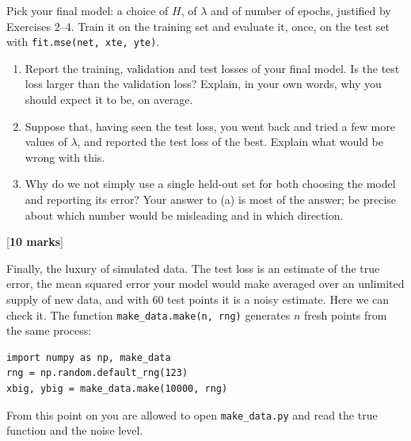 \documentclass[11pt,a4paper]{article}
\newcounter{exercise}
\newenvironment{exercise}[1]{\refstepcounter{exercise}\begin{tcolorbox}[colback=blue!4,colframe=blue!50!black,title=Exercise \theexercise: #1,fonttitle=\bfseries]}{\end{tcolorbox}}
\newcommand{\mk}[1]{\hfill[\textbf{#1 marks}]}
\begin{document}
\begin{exercise}{the test set}
Pick your final model: a choice of $H$, of $\lambda$ and of number of epochs, justified by Exercises 2--4. Train it on the training set and evaluate it, once, on the test set with \texttt{fit.mse(net, xte, yte)}.
\begin{enumerate}[label=(\alph*)]
\item Report the training, validation and test losses of your final model. Is the test loss larger than the validation loss? Explain, in your own words, why you should expect it to be, on average.
\item Suppose that, having seen the test loss, you went back and tried a few more values of $\lambda$, and reported the test loss of the best. Explain what would be wrong with this.
\item Why do we not simply use a single held-out set for both choosing the model and reporting its error? Your answer to (a) is most of the answer; be precise about which number would be misleading and in which direction.
\end{enumerate}
\mk{10}
\end{exercise}

Finally, the luxury of simulated data. The test loss is an estimate of the true error, the mean squared error your model would make averaged over an unlimited supply of new data, and with 60 test points it is a noisy estimate. Here we can check it. The function \texttt{make\_data.make(n, rng)} generates $n$ fresh points from the same process:
\begin{lstlisting}
import numpy as np, make_data
rng = np.random.default_rng(123)
xbig, ybig = make_data.make(10000, rng)
\end{lstlisting}
From this point on you are allowed to open \texttt{make\_data.py} and read the true function and the noise level.
\end{document}
